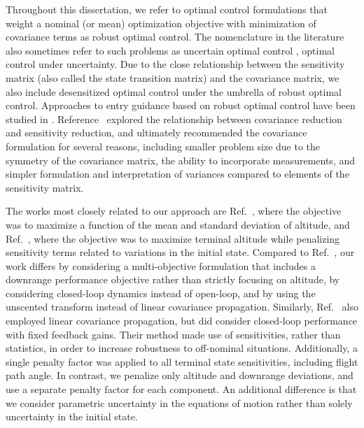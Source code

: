 Throughout this dissertation, we refer to optimal control formulations that weight a nominal (or mean) optimization objective with minimization of covariance terms as robust optimal control. The nomenclature in the literature also sometimes refer to such problems as uncertain optimal control \cite{PhelpsUncertainOCP}, optimal control under uncertainty. Due to the close relationship between the sensitivity matrix (also called the state transition matrix) and the covariance matrix, we also include desensitized optimal control \cite{Desensitized,TrajectoryDesensitization} under the umbrella of robust optimal control. 
Approaches to entry guidance based on robust optimal control have been studied in \cite{AltitudeUnderUncertainty, EntryOUUThesis1, EntryOUUThesis2, MarsEntryDesensitized, EntryOUU}. Reference~\cite{EntryOUUThesis1} explored the relationship between covariance reduction and sensitivity reduction, and ultimately recommended the covariance formulation for several reasons, including smaller problem size due to the symmetry of the covariance matrix, the ability to incorporate measurements, and simpler formulation and interpretation of variances compared to elements of the sensitivity matrix.

The works most closely related to our approach are Ref.~\cite{AltitudeUnderUncertainty}, where the objective was to maximize a function of the mean and standard deviation of altitude, and Ref.~\cite{MarsEntryDesensitized}, where the objective was to maximize terminal altitude while penalizing sensitivity terms related to variations in the initial state. Compared to Ref.~\cite{AltitudeUnderUncertainty}, our work differs by considering a multi-objective formulation that includes a downrange performance objective rather than strictly focusing on altitude, by considering closed-loop dynamics instead of open-loop, and by using the unscented transform instead of linear covariance propagation. Similarly, Ref.~\cite{MarsEntryDesensitized} also employed linear covariance propagation, but did consider closed-loop performance with fixed feedback gains. Their method made use of sensitivities, rather than statistics, in order to increase robustness to off-nominal situations. Additionally, a single penalty factor was applied to all terminal state sensitivities, including flight path angle. In contrast, we penalize only altitude and downrange deviations, and use a separate penalty factor for each component. An additional difference is that we consider parametric uncertainty in the equations of motion rather than solely uncertainty in the initial state. 

